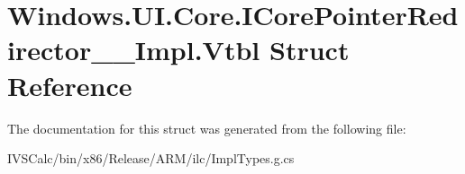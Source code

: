 \hypertarget{struct_windows_1_1_u_i_1_1_core_1_1_i_core_pointer_redirector_____impl_1_1_vtbl}{}\section{Windows.\+U\+I.\+Core.\+I\+Core\+Pointer\+Redirector\+\_\+\+\_\+\+Impl.\+Vtbl Struct Reference}
\label{struct_windows_1_1_u_i_1_1_core_1_1_i_core_pointer_redirector_____impl_1_1_vtbl}


The documentation for this struct was generated from the following file\+:\begin{DoxyCompactItemize}
\item 
I\+V\+S\+Calc/bin/x86/\+Release/\+A\+R\+M/ilc/Impl\+Types.\+g.\+cs\end{DoxyCompactItemize}
